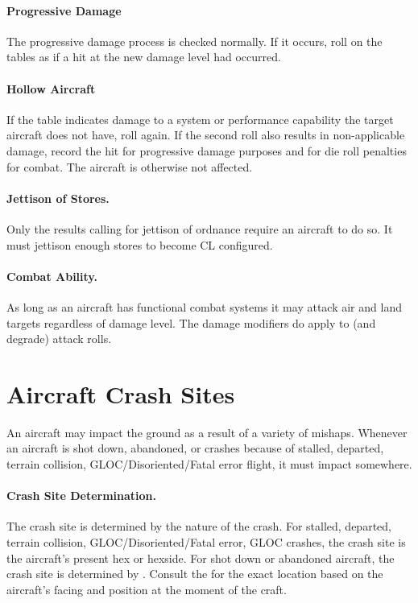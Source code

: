 \begin{advancedrules}
\paragraph{Progressive Damage} The progressive damage process is checked normally. If it occurs, roll on the tables as if a hit at the new damage level had occurred.

\paragraph{Hollow Aircraft} If the table indicates damage to a system or performance capability the target aircraft does not have, roll again. If the second roll also results in non-applicable damage, record the hit for progressive damage purposes and for die roll penalties for combat. The aircraft is otherwise not affected.

\paragraph{Jettison of Stores.} Only the results calling for jettison of ordnance require an aircraft to do so. It must jettison enough stores to become CL configured.

\paragraph{Combat Ability.} As long as an aircraft has functional combat systems it may attack air and land targets regardless of damage level. The damage modifiers do apply to (and degrade) attack rolls.

\section{Aircraft Crash Sites}


An aircraft may impact the ground as a result of a variety of mishaps. Whenever an aircraft is shot down, abandoned, or crashes because of stalled, departed, terrain collision, GLOC/Disoriented/Fatal error flight, it must impact somewhere.

\paragraph{Crash Site Determination.} The crash site is determined by the nature of the crash. For stalled, departed, terrain collision, GLOC/Disoriented/Fatal error, GLOC crashes, the crash site is the aircraft's present hex or hexside. For shot down or abandoned aircraft, the crash site is determined by . Consult the  for the exact location based on the aircraft's facing and position at the moment of the craft.


\end{advancedrules}
